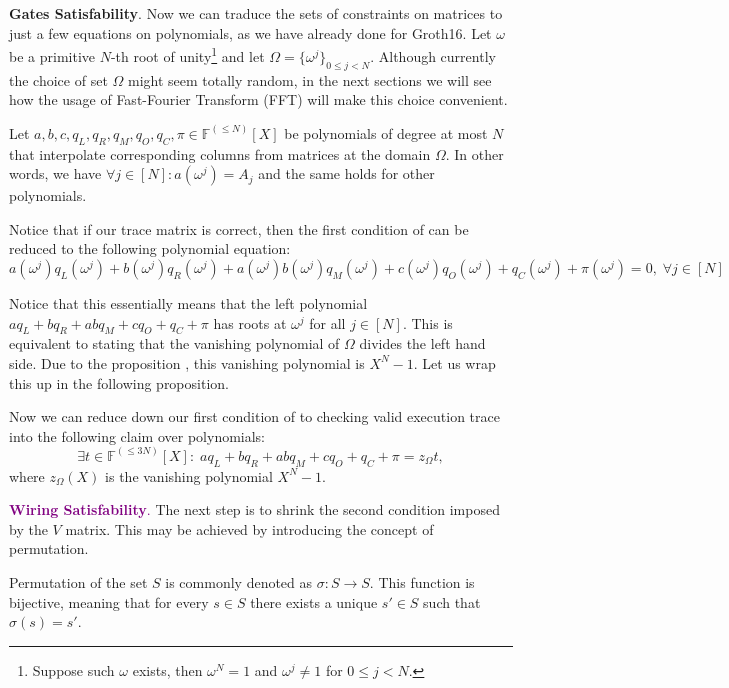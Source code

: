 \documentclass[../lecture-notes.tex]{subfiles}
\begin{document}
\textcolor{blue!80!black}{\textbf{Gates Satisfability}.} Now we can traduce the
sets of constraints on matrices to just a few equations on polynomials, as we
have already done for Groth16. Let $\omega$ be a primitive $N$-th root of
unity\footnote{Suppose such $\omega$ exists, then $\omega^N = 1$ and $\omega^j
\neq 1$ for $0 \le j < N$.} and let $\Omega = \{\omega^j\}_{0 \le j < N}$.
Although currently the choice of set $\Omega$ might seem totally random, in the
next sections we will see how the usage of Fast-Fourier Transform (FFT) will
make this choice convenient.

Let $a, b, c, q_L, q_R, q_M, q_O, q_C, \pi \in \mathbb{F}^{(\leq N)}[X]$ be
polynomials of degree at most $N$ that interpolate corresponding columns from
matrices at the domain $\Omega$. In other words, we have \(\forall j \in [N]:
a(\omega^j) = A_j\) and the same holds for other polynomials.

Notice that if our trace matrix is correct, then the first condition of
 can be reduced to the following polynomial
equation:
\begin{equation*}
    a(\omega^j)q_L(\omega^j) + b(\omega^j)q_R(\omega^j) + a(\omega^j)b(\omega^j)q_M(\omega^j) + c(\omega^j)q_O(\omega^j) + q_C(\omega^j) + \pi(\omega^j) = 0, \; \forall j \in [N]
\end{equation*}

Notice that this essentially means that the left polynomial $aq_L + bq_R + abq_M
+ cq_O + q_C + \pi$ has roots at $\omega^j$ for all $j \in [N]$. This is
equivalent to stating that the vanishing polynomial of $\Omega$ divides the left
hand side. Due to the proposition , this
vanishing polynomial is $X^N-1$.  Let us wrap this up in the following
proposition.

\begin{proposition}
    Now we can reduce down our first condition of 
    to checking valid execution trace into the following claim over polynomials:
    \[\exists t \in \mathbb{F}^{(\leq 3N)}[X]: \; aq_L + bq_R + abq_M + cq_O + q_C + \pi = z_{\Omega}t,\]
    where $z_{\Omega}(X)$ is the vanishing polynomial $X^N - 1$.
\end{proposition}

\textcolor{purple}{\textbf{Wiring Satisfability}.} The next step is to shrink the second condition imposed by the $V$ matrix. This
may be achieved by introducing the concept of permutation. 

\begin{remark}
Permutation of the set $S$ is commonly denoted as $\sigma: S \to S$. This function is bijective, meaning that for every $s \in S$ there exists a unique $s' \in S$ such that $\sigma(s) = s'$.
\end{remark}
\end{document}
